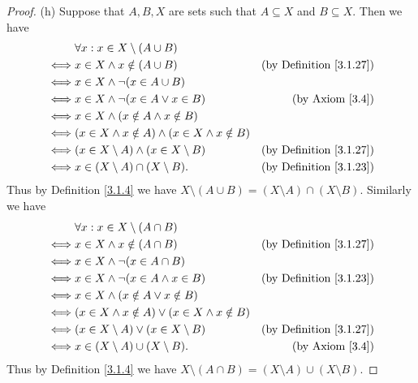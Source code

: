 \begin{proof}{(h)}
    Suppose that \(A, B, X\) are sets such that \(A \subseteq X\) and \(B \subseteq X\).
    Then we have
    \begin{align*}
             & \forall x : x \in X \setminus (A \cup B)                                                          \\
        \iff & x \in X \land x \notin (A \cup B)                           & \text{(by Definition \ref{3.1.27})} \\
        \iff & x \in X \land \lnot (x \in A \cup B)                                                              \\
        \iff & x \in X \land \lnot (x \in A \lor x \in B)                  & \text{(by Axiom \ref{3.4})}         \\
        \iff & x \in X \land (x \notin A \land x \notin B)                                                       \\
        \iff & (x \in X \land x \notin A) \land (x \in X \land x \notin B)                                       \\
        \iff & (x \in X \setminus A) \land (x \in X \setminus B)           & \text{(by Definition \ref{3.1.27})} \\
        \iff & x \in (X \setminus A) \cap (X \setminus B).                 & \text{(by Definition \ref{3.1.23})}
    \end{align*}
    Thus by Definition \ref{3.1.4} we have \(X \setminus (A \cup B) = (X \setminus A) \cap (X \setminus B)\).
    Similarly we have
    \begin{align*}
             & \forall x : x \in X \setminus (A \cap B)                                                         \\
        \iff & x \in X \land x \notin (A \cap B)                          & \text{(by Definition \ref{3.1.27})} \\
        \iff & x \in X \land \lnot (x \in A \cap B)                                                             \\
        \iff & x \in X \land \lnot (x \in A \land x \in B)                & \text{(by Definition \ref{3.1.23})} \\
        \iff & x \in X \land (x \notin A \lor x \notin B)                                                       \\
        \iff & (x \in X \land x \notin A) \lor (x \in X \land x \notin B)                                       \\
        \iff & (x \in X \setminus A) \lor (x \in X \setminus B)           & \text{(by Definition \ref{3.1.27})} \\
        \iff & x \in (X \setminus A) \cup (X \setminus B).                & \text{(by Axiom \ref{3.4})}
    \end{align*}
    Thus by Definition \ref{3.1.4} we have \(X \setminus (A \cap B) = (X \setminus A) \cup (X \setminus B)\).
\end{proof}


